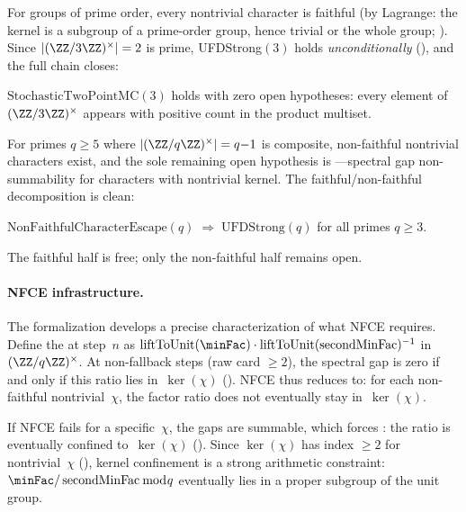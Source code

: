 \noindent For groups of prime order, every nontrivial character is
faithful (by Lagrange: the kernel is a subgroup of a prime-order group,
hence trivial or the whole group;
).
Since $|(\ZZ/3\ZZ)^\times| = 2$ is prime, UFDStrong$(3)$ holds
\emph{unconditionally}
(), and
the full chain closes:

\begin{theorem}
\label{thm:variant-mc-3}
$\mathrm{StochasticTwoPointMC}(3)$ holds with zero open hypotheses:
every element of $(\ZZ/3\ZZ)^\times$ appears with positive count
in the product multiset.
\end{theorem}

\noindent For primes $q \geq 5$ where $|(\ZZ/q\ZZ)^\times| = q{-}1$ is
composite, non-faithful nontrivial characters exist, and the sole
remaining open hypothesis is
---spectral gap non-summability
for characters with nontrivial kernel.  The faithful/non-faithful
decomposition is clean:

\begin{theorem}
\label{thm:nfce-ufdstrong}
$\mathrm{NonFaithfulCharacterEscape}(q)
\;\Longrightarrow\; \mathrm{UFDStrong}(q)$
for all primes $q \geq 3$.
\end{theorem}

\noindent The faithful half is free; only the non-faithful half
remains open.

\paragraph{NFCE infrastructure.}
The formalization develops a precise characterization of what NFCE
requires.  Define the  at step~$n$ as
$\mathrm{liftToUnit}(\minFac) \cdot
\mathrm{liftToUnit}(\operatorname{secondMinFac})^{-1}$
in~$(\ZZ/q\ZZ)^\times$.
At non-fallback steps (raw card $\geq 2$), the spectral gap is zero
if and only if this ratio lies in~$\ker(\chi)$
().
NFCE thus reduces to: for each non-faithful nontrivial~$\chi$, the
factor ratio does not eventually stay in~$\ker(\chi)$.

If NFCE fails for a specific~$\chi$, the gaps are summable,
which forces : the ratio is eventually
confined to~$\ker(\chi)$
().
Since $\ker(\chi)$ has index $\geq 2$ for nontrivial~$\chi$
(),
kernel confinement is a strong arithmetic constraint:
$\minFac / \operatorname{secondMinFac} \bmod q$ eventually lies in a
proper subgroup of the unit group.


